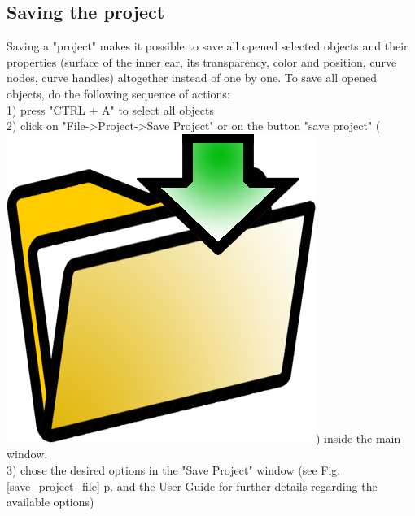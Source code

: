 \documentclass[12pt, a4paper]{book}
\begin{document}
\subsection{Saving the project}
Saving a "project" makes it possible to save all opened selected objects and their properties (surface of the inner ear, its transparency, color and position, curve nodes, curve handles) altogether instead of one by one. 
To save all opened objects, do the following sequence of actions:\\
1) press "CTRL + A" to select all objects\\
2) click on "File->Project->Save Project" or on the button "save project" (\includegraphics[scale=0.03]{../images/03/save_data.png})  inside the main window.\\
3) chose the desired options in the "Save Project" window (see Fig. \ref{save_project_file} p.\pageref{save_project_file} and the User Guide for further details regarding the available options)
\end{document}
